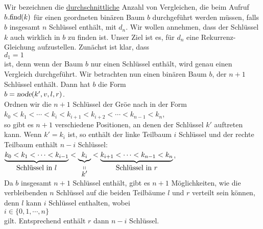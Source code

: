 
Wir bezeichnen die \underline{durchschnittliche} Anzahl von Vergleichen, die beim Aufruf
$b.\textsl{find}(k)$ f\"ur einen geordneten bin\"aren Baum $b$ durchgef\"uhrt werden m\"ussen, falls $b$
insgesamt $n$ Schl\"ussel enth\"alt, mit $d_n$.  Wir wollen annehmen, dass der Schl\"ussel $k$ auch
wirklich in $b$ zu finden ist.  Unser Ziel ist es, f\"ur $d_n$ eine Rekurrenz-Gleichung aufzustellen.
Zun\"achst
ist klar, dass \\[0.2cm]
\hspace*{1.3cm} $d_1 = 1$ \\[0.2cm]
ist, denn wenn der Baum $b$ nur einen Schl\"ussel enth\"alt, wird genau einen Vergleich durchgef\"uhrt.
Wir betrachten nun einen bin\"aren Baum $b$, der $n+1$ Schl\"ussel enth\"alt.  Dann hat $b$
die Form \\[0.2cm]
\hspace*{1.3cm} $b = \textsl{node}(k',v,l,r)$. \\[0.2cm]
Ordnen wir die $n+1$ Schl\"ussel der Gr\"o\3e nach in der Form 
\\[0.2cm]
\hspace*{1.3cm}
$k_0 < k_1 < \cdots < k_i < k_{i+1} < k_{i+2} < \cdots < k_{n-1} < k_n$,
\\[0.2cm]
so gibt es $n+1$ verschiedene Positionen, an denen
der Schl\"ussel $k'$ auftreten kann.  Wenn $k' = k_i$ ist, so enth\"alt der
linke Teilbaum $i$ Schl\"ussel und der rechte Teilbaum enth\"alt $n-i$ Schl\"ussel:
\\[0.2cm]
\hspace*{1.3cm}
$\underbrace{k_0 < k_1 < \cdots < k_{i-1}}_{\mbox{Schl\"ussel in $l$}} < 
 \underbrace{k_{i}}_{\stackrel{\displaystyle \shortparallel}{\displaystyle k'}} < 
 \underbrace{k_{i+1} < \cdots < k_{n-1} < k_n}_{\mbox{Schl\"ussel in $r$}}$,
\\[0.2cm]
Da $b$ insgesamt $n+1$ Schl\"ussel enth\"alt, gibt es $n+1$ M\"oglichkeiten, wie die
verbleibenden $n$ Schl\"ussel auf die beiden Teilb\"aume $l$ und $r$ verteilt sein k\"onnen, denn
$l$ kann $i$ Schl\"ussel enthalten, wobei \\[0.2cm]
\hspace*{1.3cm} $i \in \{0,1, \cdots, n\}$ \\[0.2cm]
gilt.  Entsprechend enth\"alt $r$ dann $n-i$ Schl\"ussel.  
